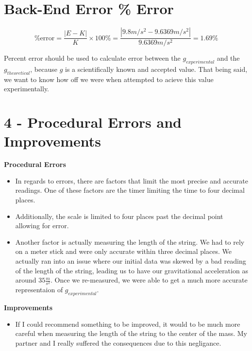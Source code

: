 \documentclass{report}
\begin{document}
\section*{Back-End Error \% Error}

  \begin{equation*}
      \% \text{error} = \frac{|E - K|}{K} \times 100 \% = \frac{|9.8 m/s^2 - 9.6369 m/s^2|}{9.6369 m/s^2} = 1.69\%
  \end{equation*}

\noindent Percent error should be used to calculate error between the $g_{experimental}$
and the $g_{theoretical}$, because $g$ is a scientifically known and accepted value. That being
said, we want to know how off we were when attempted to acieve this value experimentally.

\newpage 

\section*{4 - Procedural Errors and Improvements}

\noindent \textbf{Procedural Errors}
\begin{itemize}
  \item In regards to errors, there are factors that limit the most precise and 
        accurate readings. One of these factors are the timer limiting the time
        to four decimal places.
  \item Additionally, the scale is limited to four places past the decimal point
        allowing for error.
  \item Another factor is actually measuring the length of the string. We had to
        rely on a meter stick and were only accurate within three decimal places.
        We actually ran into an issue where our initial data was skewed by a bad 
        reading of the length of the string, leading us to have our gravitational
        acceleration as around $35 \frac{m}{s^2}$. Once we re-measured, we were able to get
        a much more accurate representaion of $g_{experimental}$.
\end{itemize}

\noindent \textbf{Improvements}
\begin{itemize}
  \item If I could recommend something to be improved, it would to be much more
        careful when measuring the length of the string to the center of the mass.
        My partner and I really suffered the consequences due to this negligance.
\end{itemize}
\end{document}
